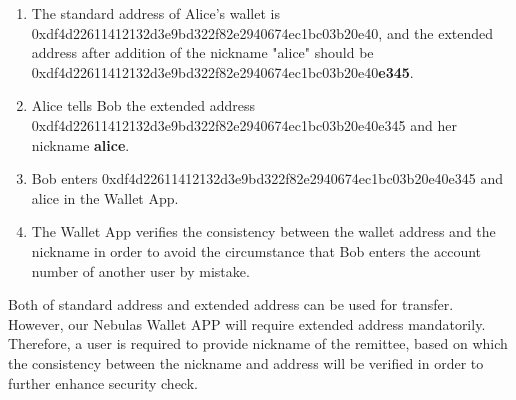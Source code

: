 \begin{enumerate}
	\item  The standard address of Alice’s wallet is  0xdf4d22611412132d3e9bd322f82e2940674ec1bc03b20e40, and the extended address after addition of the nickname "alice" should be \\ 0xdf4d22611412132d3e9bd322f82e2940674ec1bc03b20e40\textbf{e345}.
	\item Alice tells Bob the extended address 0xdf4d22611412132d3e9bd322f82e2940674ec1bc03b20e40e345 and her nickname \textbf{alice}.
	\item Bob enters 0xdf4d22611412132d3e9bd322f82e2940674ec1bc03b20e40e345 and alice in the Wallet App.
	\item The Wallet App verifies the consistency between the wallet address and the nickname in order to avoid the circumstance that Bob enters the account number of another user by mistake.
\end{enumerate}

Both of standard address and extended address can be used for transfer. However, our Nebulas Wallet APP will require extended address mandatorily. Therefore, a user is required to provide nickname of the remittee, based on which the consistency between the nickname and address will be verified in order to further enhance security check.

